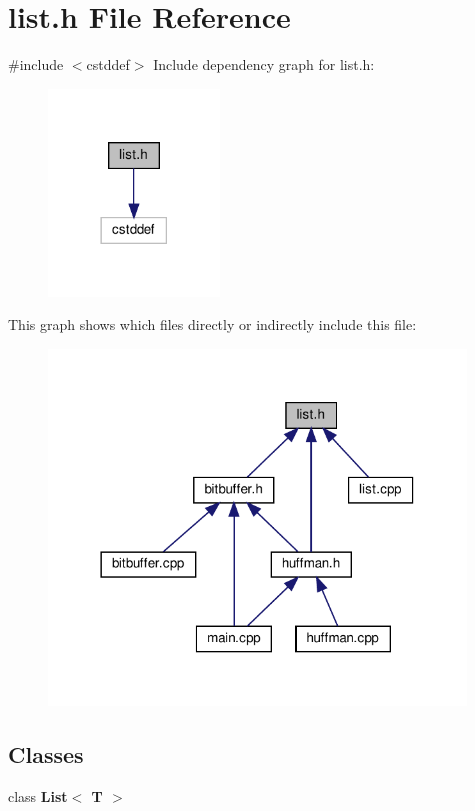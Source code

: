 \section{list.\+h File Reference}
\label{list_8h}
{\ttfamily \#include $<$cstddef$>$}\newline
Include dependency graph for list.\+h\+:
\nopagebreak
\begin{figure}[H]
\begin{center}
\leavevmode
\includegraphics[width=129pt]{list_8h__incl}
\end{center}
\end{figure}
This graph shows which files directly or indirectly include this file\+:
\nopagebreak
\begin{figure}[H]
\begin{center}
\leavevmode
\includegraphics[width=314pt]{list_8h__dep__incl}
\end{center}
\end{figure}
\subsection*{Classes}
\begin{DoxyCompactItemize}
\item 
class \textbf{ List$<$ T $>$}
\end{DoxyCompactItemize}

